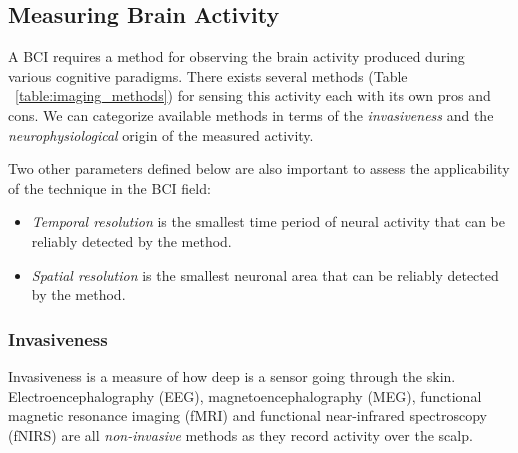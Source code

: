\documentclass[12pt]{article}
\newcommand\mysubsection[1]{\subsection{#1}}
\newcommand\mysubsubsection[1]{\subsubsection{#1}}
\numberwithin{equation}{section}
\numberwithin{figure}{section}
\numberwithin{table}{section}
\begin{document}
\mysubsection{Measuring Brain Activity}\label{seq:brain_imaging}
\par{
    A BCI requires a method for observing the brain activity produced during
    various cognitive paradigms. There exists several methods (Table ~\ref{table:imaging_methods}) for sensing
    this activity each with its own pros and cons. We can categorize available
    methods in terms of the \emph{invasiveness} and the \emph{neurophysiological}
    origin of the measured activity.
}
\par{
    Two other parameters defined below are also important to
    assess the applicability of the technique in the BCI field:
    \begin{itemize}
        \item \emph{Temporal resolution} is the smallest time period of neural activity
            that can be reliably detected by the method.
        \item \emph{Spatial resolution} is the smallest neuronal area that can be
            reliably detected by the method.
    \end{itemize}
}
\mysubsubsection{Invasiveness}\label{seq:invasiveness}
\par{
    Invasiveness is a measure of how deep is a sensor going through the skin.
    Electroencephalography (EEG), magnetoencephalography (MEG), functional magnetic
    resonance imaging (fMRI) and functional near-infrared spectroscopy (fNIRS)
    are all \emph{non-invasive} methods as they record activity over the scalp.
}
\end{document}

